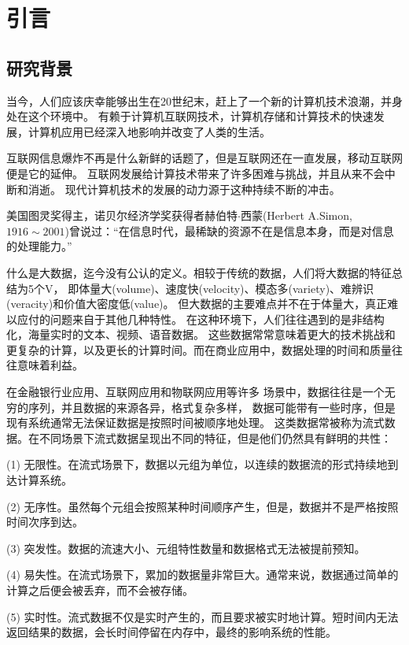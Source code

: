 
\chapter{引言}
\label{chapter:intro}

\section{研究背景}
当今，人们应该庆幸能够出生在20世纪末，赶上了一个新的计算机技术浪潮，并身处在这个环境中。
有赖于计算机互联网技术，计算机存储和计算技术的快速发展，计算机应用已经深入地影响并改变了人类的生活。

互联网信息爆炸不再是什么新鲜的话题了，但是互联网还在一直发展，移动互联网便是它的延伸。
互联网发展给计算技术带来了许多困难与挑战，并且从来不会中断和消逝。
现代计算机技术的发展的动力源于这种持续不断的冲击。

美国图灵奖得主，诺贝尔经济学奖获得者赫伯特$\cdot$西蒙(Herbert A.Simon, $1916\sim2001$)曾说过：“在信息时代，最稀缺的资源不在是信息本身，而是对信息的处理能力。”

什么是大数据，迄今没有公认的定义。相较于传统的数据，人们将大数据的特征总结为5个V，
即体量大(volume)、速度快(velocity)、模态多(variety)、难辨识(veracity)和价值大密度低(value)\cite{cxq2014Survey}。
但大数据的主要难点并不在于体量大，真正难以应付的问题来自于其他几种特性。
在这种环境下，人们往往遇到的是非结构化，海量实时的文本、视频、语音数据。
这些数据常常意味着更大的技术挑战和更复杂的计算，以及更长的计算时间。而在商业应用中，数据处理的时间和质量往往意味着利益。

在金融银行业应用、互联网应用和物联网应用\cite{sun2013bdsc}等许多
场景中，数据往往是一个无穷的序列，并且数据的来源各异，格式复杂多样，
数据可能带有一些时序，但是现有系统通常无法保证数据是按照时间被顺序地处理。
这类数据常被称为流式数据。在不同场景下流式数据呈现出不同的特征，但是他们仍然具有鲜明的共性：

(1) 无限性。在流式场景下，数据以元组为单位，以连续的数据流的形式持续地到达计算系统。

(2) 无序性。虽然每个元组会按照某种时间顺序产生，但是，数据并不是严格按照时间次序到达。

(3) 突发性。数据的流速大小、元组特性数量和数据格式无法被提前预知。

(4) 易失性。在流式场景下，累加的数据量非常巨大。通常来说，数据通过简单的计算之后便会被丢弃，而不会被存储。

(5) 实时性。流式数据不仅是实时产生的，而且要求被实时地计算。短时间内无法返回结果的数据，会长时间停留在内存中，最终的影响系统的性能。

